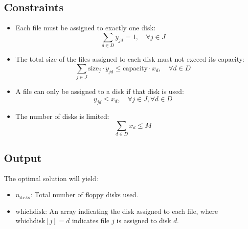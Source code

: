\documentclass{article}
\begin{document}
\subsection*{Constraints}
\begin{itemize}
    \item Each file must be assigned to exactly one disk:
    \[
    \sum_{d \in D} y_{jd} = 1, \quad \forall j \in J
    \]

    \item The total size of the files assigned to each disk must not exceed its capacity:
    \[
    \sum_{j \in J} \text{size}_j \cdot y_{jd} \leq \text{capacity} \cdot x_d, \quad \forall d \in D
    \]

    \item A file can only be assigned to a disk if that disk is used:
    \[
    y_{jd} \leq x_d, \quad \forall j \in J, \forall d \in D
    \]

    \item The number of disks is limited:
    \[
    \sum_{d \in D} x_d \leq M
    \]
\end{itemize}

\subsection*{Output}
The optimal solution will yield:
\begin{itemize}
    \item \( n_{\text{disks}} \): Total number of floppy disks used.
    \item \( \text{whichdisk} \): An array indicating the disk assigned to each file, where \( \text{whichdisk}[j] = d \) indicates file \( j \) is assigned to disk \( d \).
\end{itemize}
\end{document}
